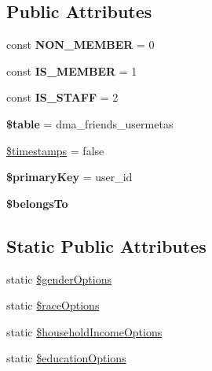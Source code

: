 \subsection*{Public Attributes}
\begin{DoxyCompactItemize}
\item 
\hypertarget{classDMA_1_1Friends_1_1Models_1_1Usermeta_a3e0526daabd8785649e0755dbdf4ebae}{}const {\bfseries N\+O\+N\+\_\+\+M\+E\+M\+B\+E\+R} = 0\label{classDMA_1_1Friends_1_1Models_1_1Usermeta_a3e0526daabd8785649e0755dbdf4ebae}

\item 
\hypertarget{classDMA_1_1Friends_1_1Models_1_1Usermeta_aa5a492cddba999d3798f2d0c2340fad5}{}const {\bfseries I\+S\+\_\+\+M\+E\+M\+B\+E\+R} = 1\label{classDMA_1_1Friends_1_1Models_1_1Usermeta_aa5a492cddba999d3798f2d0c2340fad5}

\item 
\hypertarget{classDMA_1_1Friends_1_1Models_1_1Usermeta_a73c2b62b4d8e31f04c362931cf4fad77}{}const {\bfseries I\+S\+\_\+\+S\+T\+A\+F\+F} = 2\label{classDMA_1_1Friends_1_1Models_1_1Usermeta_a73c2b62b4d8e31f04c362931cf4fad77}

\item 
\hypertarget{classDMA_1_1Friends_1_1Models_1_1Usermeta_a7ca76640d4cd53c875648ec87d085f1d}{}{\bfseries \$table} = \textquotesingle{}dma\+\_\+friends\+\_\+usermetas\textquotesingle{}\label{classDMA_1_1Friends_1_1Models_1_1Usermeta_a7ca76640d4cd53c875648ec87d085f1d}

\item 
\hyperlink{classDMA_1_1Friends_1_1Models_1_1Usermeta_a085486010d2c88f8676ac2e4fdbc257d}{\$timestamps} = false
\item 
\hypertarget{classDMA_1_1Friends_1_1Models_1_1Usermeta_a664f37df5630b8a17b65b5d95192780b}{}{\bfseries \$primary\+Key} = \textquotesingle{}user\+\_\+id\textquotesingle{}\label{classDMA_1_1Friends_1_1Models_1_1Usermeta_a664f37df5630b8a17b65b5d95192780b}

\item 
{\bfseries \$belongs\+To}
\end{DoxyCompactItemize}
\subsection*{Static Public Attributes}
\begin{DoxyCompactItemize}
\item 
static \hyperlink{classDMA_1_1Friends_1_1Models_1_1Usermeta_a85cf8b9b7dd2582d64ac9e130dd0069d}{\$gender\+Options}
\item 
static \hyperlink{classDMA_1_1Friends_1_1Models_1_1Usermeta_adcfe27bcb392a9cdab20c59e612a0d7a}{\$race\+Options}
\item 
static \hyperlink{classDMA_1_1Friends_1_1Models_1_1Usermeta_a0578ccf8e50b07c1a6ec66118671d7a3}{\$household\+Income\+Options}
\item 
static \hyperlink{classDMA_1_1Friends_1_1Models_1_1Usermeta_a2d958b56be7414a58e8db11ce8b636ae}{\$education\+Options}
\end{DoxyCompactItemize}
